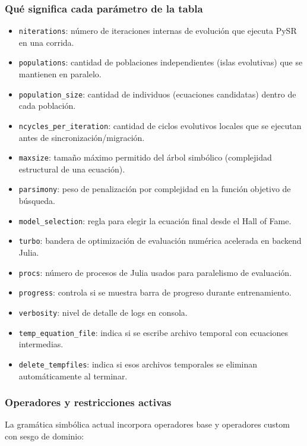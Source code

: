 \documentclass[12pt]{article}
\begin{document}
\subsubsection*{Qué significa cada parámetro de la tabla}
\begin{itemize}[leftmargin=1.5em]
    \item \texttt{niterations}: número de iteraciones internas de evolución que ejecuta PySR en una corrida.
    \item \texttt{populations}: cantidad de poblaciones independientes (islas evolutivas) que se mantienen en paralelo.
    \item \texttt{population\_size}: cantidad de individuos (ecuaciones candidatas) dentro de cada población.
    \item \texttt{ncycles\_per\_iteration}: cantidad de ciclos evolutivos locales que se ejecutan antes de sincronización/migración.
    \item \texttt{maxsize}: tamaño máximo permitido del árbol simbólico (complejidad estructural de una ecuación).
    \item \texttt{parsimony}: peso de penalización por complejidad en la función objetivo de búsqueda.
    \item \texttt{model\_selection}: regla para elegir la ecuación final desde el Hall of Fame.
    \item \texttt{turbo}: bandera de optimización de evaluación numérica acelerada en backend Julia.
    \item \texttt{procs}: número de procesos de Julia usados para paralelismo de evaluación.
    \item \texttt{progress}: controla si se muestra barra de progreso durante entrenamiento.
    \item \texttt{verbosity}: nivel de detalle de logs en consola.
    \item \texttt{temp\_equation\_file}: indica si se escribe archivo temporal con ecuaciones intermedias.
    \item \texttt{delete\_tempfiles}: indica si esos archivos temporales se eliminan automáticamente al terminar.
\end{itemize}

\subsubsection*{Operadores y restricciones activas}
La gramática simbólica actual incorpora operadores base y operadores custom con sesgo de dominio:
\end{document}
